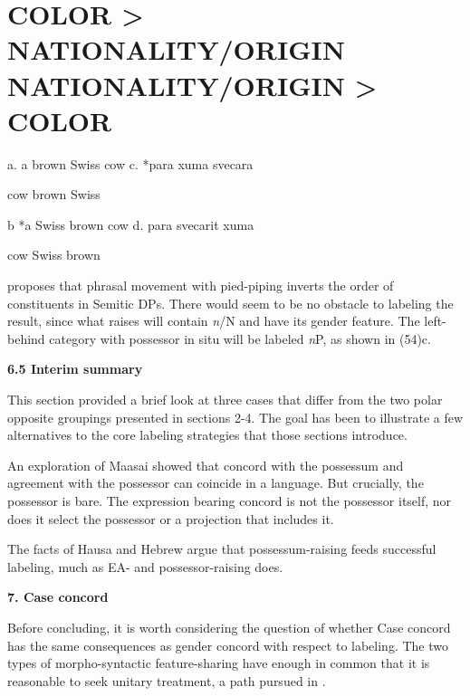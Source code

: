 \documentclass[output=paper
,modfonts
,nonflat]{langsci/langscibook}
\begin{document}
\section{    COLOR > NATIONALITY/ORIGIN      NATIONALITY/ORIGIN > COLOR} 
\label{bkm:Ref512438959}\begin{stylegloss}
a.  a brown Swiss cow                     c. *para  xuma   svecara      
\end{stylegloss}

\begin{stylegloss}
cow   brown Swiss        
\end{stylegloss}

\begin{stylegloss}
b   *a Swiss brown cow                     d.   para svecarit  xuma
\end{stylegloss}

\begin{stylegloss}
cow  Swiss      brown
\end{stylegloss}

\citet{Shlonsky2004} proposes that phrasal movement with pied-piping inverts the order of constituents in Semitic DPs. There would seem to be no obstacle to labeling the result, since what raises will contain \textit{n}/N and have its gender feature. The left-behind category with possessor in situ will be labeled \textit{n}P, as shown in (54)c.

\textbf{6.5  Interim summary}

This section provided a brief look at three cases that differ from the two polar opposite groupings presented in sections 2-4. The goal has been to illustrate a few alternatives to the core labeling strategies that those sections introduce. 

An exploration of Maasai showed that concord with the possessum and agreement with the possessor can coincide in a language. But crucially, the possessor is bare. The expression bearing concord is not the possessor itself, nor does it select the possessor or a projection that includes it.  

The facts of Hausa and Hebrew argue that possessum-raising feeds successful labeling, much as EA- and possessor-raising does.

\textbf{7.  Case concord}

Before concluding, it is worth considering the question of whether Case concord has the same consequences as gender concord with respect to labeling. The two types of morpho-syntactic feature-sharing have enough in common that it is reasonable to seek unitary treatment, a path pursued in \citealt{Norris2014}. 
\end{document}
